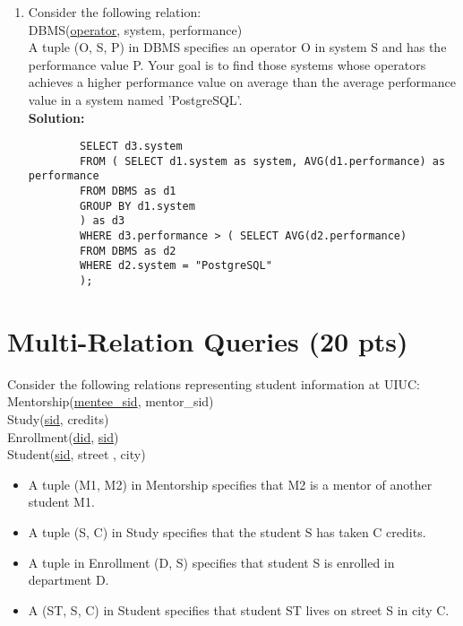 \documentclass[paper=a4, fontsize=11pt]{scrartcl}
\numberwithin{equation}{section}		%
\numberwithin{figure}{section}			%
\numberwithin{table}{section}				%
\begin{document}
\begin{enumerate}
		
		\item Consider the following relation:\\
		DBMS(\underline{operator}, system, performance)\\
		A tuple (O, S, P) in DBMS specifies an operator O in system S and has the performance value P. Your goal is to find those systems whose operators achieves a higher performance value on average than the average performance value in a system named 'PostgreSQL'.\\
		\textbf{Solution: }
		\begin{lstlisting}
		SELECT d3.system
		FROM ( SELECT d1.system as system, AVG(d1.performance) as performance
		FROM DBMS as d1
		GROUP BY d1.system
		) as d3
		WHERE d3.performance > ( SELECT AVG(d2.performance)
		FROM DBMS as d2
		WHERE d2.system = "PostgreSQL"
		);
		\end{lstlisting}
		
		
	\end{enumerate}
	
	
	\section{Multi-Relation Queries (20 pts)}
	Consider the following relations representing student information at UIUC:\\
	Mentorship(\underline{mentee\_sid}, mentor\_sid)\\
	Study(\underline{sid}, credits)\\
	Enrollment(\underline{did}, \underline{sid})\\
	Student(\underline{sid}, street , city)
	
	\begin{itemize}
		\item A tuple (M1, M2) in Mentorship specifies that M2 is a mentor of another student M1. 
		\item A tuple (S, C) in Study specifies that the student S has taken C credits.
		\item A tuple in Enrollment (D, S) specifies that student S is enrolled in department D. 
		\item A (ST, S, C) in Student specifies that student ST lives on street S in city C.
	\end{itemize}
	
\end{document}
